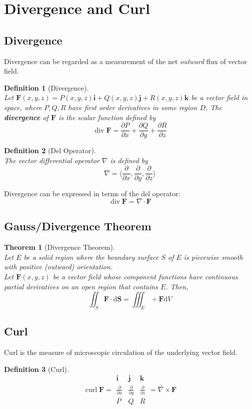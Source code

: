 \documentclass[12pt]{article}
\newtheorem{definition}{Definition}[section]
\newtheorem{theorem}{Theorem}[section]
\theoremstyle{definition}
\newcommand{\diff}{\mathrm{d}}
\DeclareMathOperator{\curl}{curl}
\DeclareMathOperator{\divg}{div}
\begin{document}
\section{Divergence and Curl}
\subsection{Divergence}
Divergence can be regarded as a measurement of the net \textit{outward} flux of vector field.
\begin{definition}[Divergence]
\hfill\\\normalfont Let $\mathbf{F}(x,y,z)=P(x,y,z)\mathbf{i}+Q(x,y,z)\mathbf{j}+R(x,y,z)\mathbf{k}$ be a vector field in space, where $P,Q,R$ have first order derivatives in some region $D$. The \textbf{divergence} of $\mathbf{F}$ is the scalar function defined by
\[
\divg \mathbf{F} = \frac{\partial P}{\partial x}+\frac{\partial Q}{\partial y}+\frac{\partial R}{\partial z}
\]
\end{definition}
\begin{definition}[Del Operator]
\hfill\\\normalfont The vector differential operator $\nabla$ is defined by
\[
\nabla = \langle \frac{\partial}{\partial x}, \frac{\partial}{\partial y},\frac{\partial}{\partial z}\rangle
\]
\end{definition}
Divergence can be expressed in terms of the del operator:
\[
\divg \mathbf{F}=\nabla\cdot \mathbf{F}
\]
\subsection{Gauss/Divergence Theorem}
\begin{theorem}[Divergence Theorem]
\hfill\\\normalfont Let $E$ be a solid region where the boundary surface $S$ of $E$ is piecewise smooth with positive (outward) orientation.\\Let $\mathbf{F}(x,y,z)$ be a vector field whose component functions have continuous partial derivatives on an open region that contains $E$. Then,
\[
\iint_S\mathbf{F}\cdot\diff\mathbf{S}=\iiint_E\div\mathbf{F}\diff V
\]
\end{theorem}
\subsection{Curl}
Curl is the measure of microscopic circulation of the underlying vector field.
\begin{definition}[Curl]
\hfill\\\normalfont
\[
\curl \mathbf{F} = \begin{array}{|ccc|}
\mathbf{i}&\mathbf{j}&\mathbf{k}\\
\frac{\partial}{\partial x}&\frac{\partial}{\partial y}&\frac{\partial}{\partial z}\\
P&Q&R\end{array}=\nabla\times\mathbf{F} 
\]
\end{definition}
\end{document}
